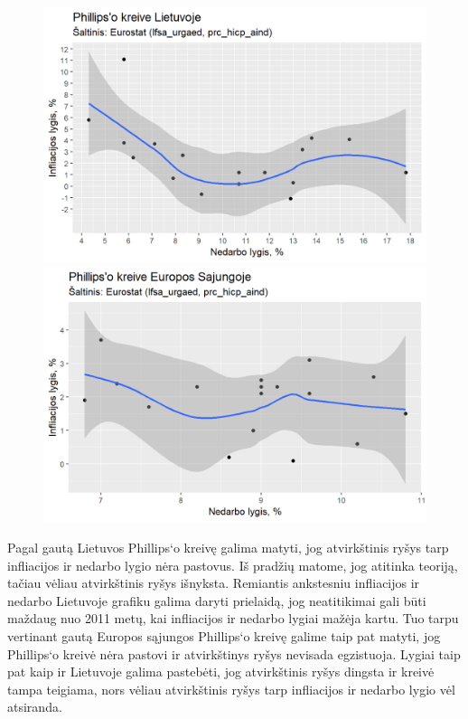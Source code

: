 \documentclass[11pt, titlepage]{article}
\begin{document}
\begin{figure}[h]
	\begin{minipage}[t]{3cm}
		\includegraphics[scale=0.5]{LT_phillips.png}
	\end{minipage}
	\hspace{4cm}
	\begin{minipage}[t]{3cm}
		\includegraphics[scale=0.5]{EU_phillips.png}
	\end{minipage}
\end{figure}



Pagal gautą Lietuvos Phillips‘o kreivę galima matyti, jog atvirkštinis ryšys tarp infliacijos ir nedarbo lygio nėra pastovus. Iš pradžių matome, jog atitinka teoriją, tačiau vėliau atvirkštinis ryšys išnyksta. Remiantis ankstesniu infliacijos ir nedarbo Lietuvoje grafiku galima daryti prielaidą, jog neatitikimai gali būti maždaug nuo 2011 metų, kai infliacijos ir nedarbo lygiai mažėja kartu. Tuo tarpu vertinant gautą Europos sąjungos Phillips‘o kreivę galime taip pat matyti, jog Phillips‘o kreivė nėra pastovi ir atvirkštinys ryšys nevisada egzistuoja. Lygiai taip pat kaip ir Lietuvoje galima pastebėti, jog atvirkštinis ryšys dingsta ir kreivė tampa teigiama, nors vėliau atvirkštinis ryšys tarp infliacijos ir nedarbo lygio vėl atsiranda. 
\end{document}
